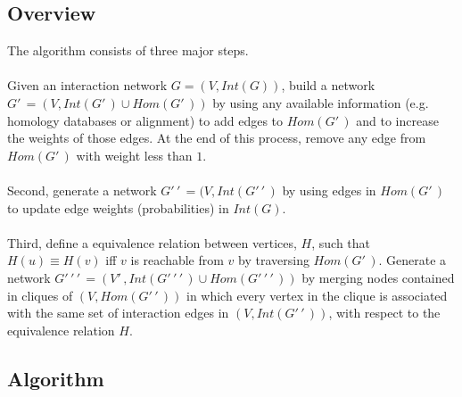 \documentclass[11pt]{article}
\begin{document}
\subsection*{Overview}

The algorithm consists of three major steps.\\\\
Given an interaction network $G=(V,Int(G))$, build a network $G'\,\! = (V,Int(G'\,\!) \cup Hom(G'\,\!))$ by using any available information (e.g. homology databases or alignment) to add edges to $Hom(G'\,\!)$ and to increase the weights of those edges. At the end of this process, remove any edge from $Hom(G'\,\!)$ with  weight less than $1$.\\\\
Second, generate a network $G'\,\!'\,\! = (V, Int(G'\,\!'\,\!)$ by using edges in $Hom(G'\,\!)$ to update edge weights (probabilities) in $Int(G)$.\\\\
Third, define a equivalence relation between vertices, $H$, such that $H(u) \equiv H(v)$ iff $v$ is reachable from $v$ by traversing $Hom(G'\,\!)$. Generate a network $G'\,\!'\,\!'\,\! = (V'\,\!, Int(G'\,\!'\,\!'\,\!) \cup Hom(G'\,\!'\,\!'\,\!))$ by merging nodes contained in cliques of $(V,Hom(G'\,\!'\,\!))$ in which every vertex in the clique is associated with the same set of interaction edges in $(V, Int(G'\,\!'\,\!))$, with respect to the equivalence relation $H$.

\subsection*{Algorithm}
\end{document}

